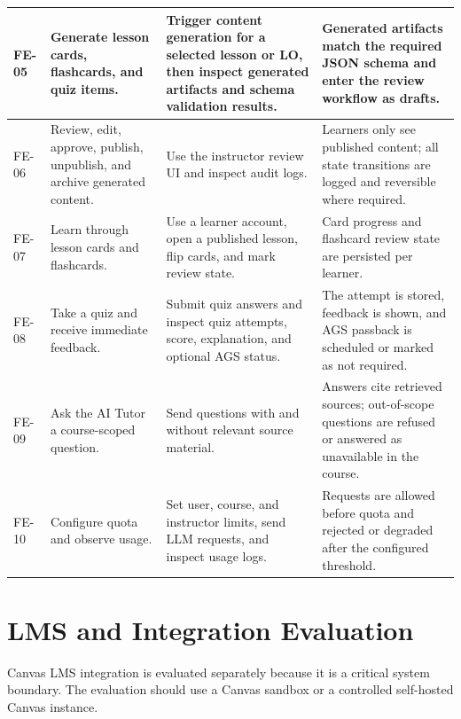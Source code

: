 \begin{longtable}{|p{1.8cm}|p{4.8cm}|p{4.0cm}|p{3.1cm}|}
    FE-05
        & Generate lesson cards, flashcards, and quiz items.
        & Trigger content generation for a selected lesson or LO, then inspect
          generated artifacts and schema validation results.
        & Generated artifacts match the required JSON schema and enter the
          review workflow as drafts. \\
    \hline

    FE-06
        & Review, edit, approve, publish, unpublish, and archive generated
          content.
        & Use the instructor review UI and inspect audit logs.
        & Learners only see published content; all state transitions are logged
          and reversible where required. \\
    \hline

    FE-07
        & Learn through lesson cards and flashcards.
        & Use a learner account, open a published lesson, flip cards, and mark
          review state.
        & Card progress and flashcard review state are persisted per learner. \\
    \hline

    FE-08
        & Take a quiz and receive immediate feedback.
        & Submit quiz answers and inspect quiz attempts, score, explanation,
          and optional AGS status.
        & The attempt is stored, feedback is shown, and AGS passback is
          scheduled or marked as not required. \\
    \hline

    FE-09
        & Ask the AI Tutor a course-scoped question.
        & Send questions with and without relevant source material.
        & Answers cite retrieved sources; out-of-scope questions are refused or
          answered as unavailable in the course. \\
    \hline

    FE-10
        & Configure quota and observe usage.
        & Set user, course, and instructor limits, send LLM requests, and inspect
          usage logs.
        & Requests are allowed before quota and rejected or degraded after the
          configured threshold. \\
    \hline
\end{longtable}

\section{LMS and Integration Evaluation}

Canvas LMS integration is evaluated separately because it is a critical
system boundary. The evaluation should use a Canvas sandbox or a controlled
self-hosted Canvas instance.

